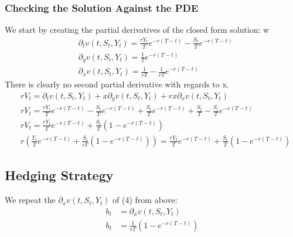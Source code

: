 \documentclass[a4paper,12pt]{article}
\begin{document}
\subsubsection{Checking the Solution Against the PDE}
We start by creating the partial derivatives of the closed form solution:
w\begin{align*}
&\partial_tv(t, S_t, Y_t) = \frac{rY_t}{T}e^{-r(T -  t)} - \frac{S_t}{T} e^{-r(T -  t)} \\
&\partial_yv(t, S_t, Y_t) = \frac{1}{T}e^{-r(T -  t)} \\
&\partial_xv(t, S_t, Y_t) = \frac{1}{rT} - \frac{1}{rT}e^{-r(T -  t)}
\end{align*}
There is clearly no second partial derivative with regards to x.
\begin{align*}
&rV_t = \partial_t v(t, S_t, Y_t) + x \partial_y v(t, S_t, Y_t) + rx \partial_x v(t, S_t, Y_t) \\
&rV_t = \frac{rY_t}{T}e^{-r(T -  t)} - \frac{S_t}{T} e^{-r(T -  t)} + \frac{S_t}{T}e^{-r(T -  t)} + \frac{S_t}{T} - \frac{S_t}{T}e^{-r(T -  t)} \\
&rV_t = \frac{rY_t}{T}e^{-r(T -  t)} + \frac{S_t}{T}(1 - e^{-r(T -  t)}) \\
&r(\frac{Y_t}{T}e^{-r(T -  t)} + \frac{S_t}{rT}(1 - e^{-r(T -  t)})) = \frac{rY_t}{T}e^{-r(T -  t)} + \frac{S_t}{T}(1 - e^{-r(T -  t)})
\end{align*}

\subsection{Hedging Strategy}
We repeat the $\partial_xv(t, S_t, Y_t)$ of (4) from above:
\begin{align*}
b_t &= \partial_xv(t, S_t, Y_t) \\
b_t &= \frac{1}{rT}(1 - e^{-r(T -  t)})
\end{align*}
\end{document}
